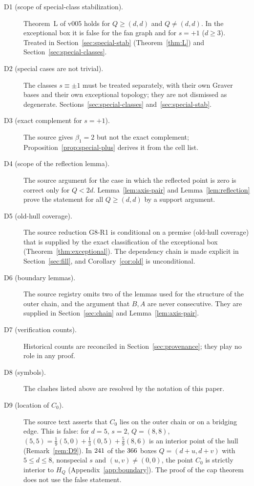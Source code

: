\begin{description}
\item[D1 (scope of special-class stabilization).] Theorem~L of v005 holds for $Q\ge(d,d)$ and $Q\ne(d,d)$. In the exceptional box it is false for the fan graph and for $s=+1$ ($d\ge3$). Treated in Section~\ref{sec:special-stab} (Theorem~\ref{thm:L}) and Section~\ref{sec:special-classes}.
\item[D2 (special cases are not trivial).] The classes $s\equiv\pm1$ must be treated separately, with their own Graver bases and their own exceptional topology; they are not dismissed as degenerate. Sections~\ref{sec:special-classes} and~\ref{sec:special-stab}.
\item[D3 (exact complement for $s=+1$).] The source gives $\beta_1=2$ but not the exact complement; Proposition~\ref{prop:special-plus} derives it from the cell list.
\item[D4 (scope of the reflection lemma).] The source argument for the case in which the reflected point is zero is correct only for $Q<2d$. Lemma~\ref{lem:axis-pair} and Lemma~\ref{lem:reflection} prove the statement for all $Q\ge(d,d)$ by a support argument.
\item[D5 (old-hull coverage).] The source reduction G8-R1 is conditional on a premise (old-hull coverage) that is supplied by the exact classification of the exceptional box (Theorem~\ref{thm:exceptional}). The dependency chain is made explicit in Section~\ref{sec:fill}, and Corollary~\ref{cor:old} is unconditional.
\item[D6 (boundary lemmas).] The source registry omits two of the lemmas used for the structure of the outer chain, and the argument that $B,A$ are never consecutive. They are supplied in Section~\ref{sec:chain} and Lemma~\ref{lem:axis-pair}.
\item[D7 (verification counts).] Historical counts are reconciled in Section~\ref{sec:provenance}; they play no role in any proof.
\item[D8 (symbols).] The clashes listed above are resolved by the notation of this paper.
\item[D9 (location of $C_0$).] The source text asserts that $C_0$ lies on the outer chain or on a bridging edge. This is false: for $d=5$, $s=2$, $Q=(8,8)$, $(5,5)=\frac19(5,0)+\frac13(0,5)+\frac59(8,6)$ is an interior point of the hull (Remark~\ref{rem:D9}). In $241$ of the $366$ boxes $Q=(d+u,d+v)$ with $5\le d\le8$, nonspecial $s$ and $(u,v)\ne(0,0)$, the point $C_0$ is strictly interior to $H_Q$ (Appendix~\ref{app:boundary}). The proof of the cap theorem does not use the false statement.
\end{description}


